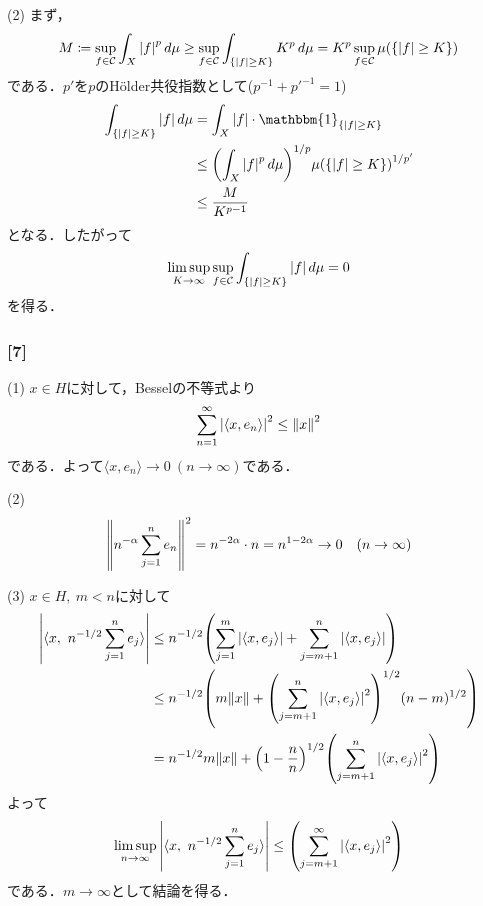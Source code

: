 \documentclass[a4j]{ltjsarticle}
\newcommand{\1}{\mathbbm{1}}
\numberwithin{equation}{section}
\theoremstyle{definition}
\begin{document}
(2) まず，
\begin{equation}
    M\coloneq \sup_{f\in\mathcal{C}}\int_{X}\abs{f}^p\,d\mu\geq \sup_{f\in\mathcal{C} }\int_{\qty{\abs{f}\geq K}}K^p\,d\mu=K^p\sup_{f\in \mathcal{C}}\mu(\qty{\abs{f}\geq K})
\end{equation}
である．$p'$を$p$のHölder共役指数として($p^{-1}+p'^{-1}=1$)
\begin{align}
    \int_{\qty{\abs{f}\geq K}}\abs{f}\,d\mu&=\int_{X}\abs{f}\cdot \1_{\qty{\abs{f}\geq K}}\\
    &\leq \qty(\int_{X}\abs{f}^p\,d\mu)^{1/p}\mu\qty(\qty{\abs{f}\geq K})^{1/p'}\\
    &\leq \frac{M}{K^{p-1}}
\end{align}
となる．したがって
\begin{equation}
    \limsup_{K\to\infty}\sup_{f\in \mathcal{C}}\int_{\qty{\abs{f}\geq K}}\abs{f}\,d\mu=0
\end{equation}
を得る．
\subsubsection*{[7]}
(1) $x\in H$に対して，Besselの不等式より
\begin{equation}
    \sum_{n=1}^\infty\abs{\langle x,e_n\rangle}^2\leq \norm{x}^2
\end{equation}
である．よって$\langle x,e_n\rangle\to0\ (n\to\infty)$である．

(2) 
\begin{equation}
    \norm{n^{-\alpha}\sum_{j=1}^n e_n}^2=n^{-2\alpha}\cdot n=n^{1-2\alpha}\to0\quad (n\to\infty)
\end{equation}

(3) $x\in H,\ m<n$に対して
\begin{align}
    \abs{\langle x,\ n^{-1/2}\sum_{j=1}^n e_j\rangle}&\leq n^{-1/2}\qty(\sum_{j=1}^m\abs{\langle x,e_j\rangle}+\sum_{j=m+1}^n \abs{\langle x,e_j\rangle})\\
    &\leq n^{-1/2}\qty(m\norm{x}+\qty(\sum_{j=m+1}^n \abs{\langle x,e_j\rangle}^2)^{1/2}(n-m)^{1/2})\\
    &=n^{-1/2}m\norm{x}+\qty(1-\frac{n}{n})^{1/2}\qty(\sum_{j=m+1}^n \abs{\langle x,e_j\rangle}^2)
\end{align}
よって 
\begin{equation}
    \limsup_{n\to\infty}\abs{\langle x,\ n^{-1/2}\sum_{j=1}^n e_j\rangle}\leq \qty(\sum_{j=m+1}^{\infty} \abs{\langle x,e_j\rangle}^2)
\end{equation}
である．$m\to\infty$として結論を得る．
\end{document}
